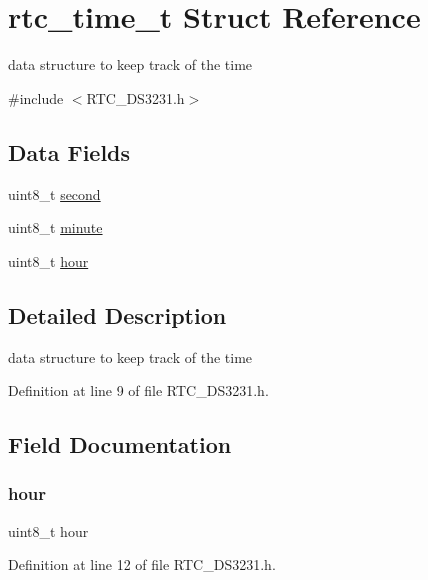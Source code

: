 \hypertarget{structrtc__time__t}{}\section{rtc\+\_\+time\+\_\+t Struct Reference}
\label{structrtc__time__t}


data structure to keep track of the time  




{\ttfamily \#include $<$R\+T\+C\+\_\+\+D\+S3231.\+h$>$}

\subsection*{Data Fields}
\begin{DoxyCompactItemize}
\item 
uint8\+\_\+t \hyperlink{structrtc__time__t_a8459fc4e94de7eefc74991e41779c8fc}{second}
\item 
uint8\+\_\+t \hyperlink{structrtc__time__t_a8ff981ec55c945940f4a0da7d8709b3c}{minute}
\item 
uint8\+\_\+t \hyperlink{structrtc__time__t_ae5af4ff48939d13d480f87e56a9385d6}{hour}
\end{DoxyCompactItemize}


\subsection{Detailed Description}
data structure to keep track of the time 

Definition at line 9 of file R\+T\+C\+\_\+\+D\+S3231.\+h.



\subsection{Field Documentation}
\hypertarget{structrtc__time__t_ae5af4ff48939d13d480f87e56a9385d6}{}\label{structrtc__time__t_ae5af4ff48939d13d480f87e56a9385d6} 
\subsubsection{\texorpdfstring{hour}{hour}}
{\footnotesize\ttfamily uint8\+\_\+t hour}



Definition at line 12 of file R\+T\+C\+\_\+\+D\+S3231.\+h.

